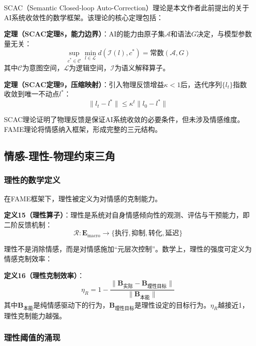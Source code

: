 \documentclass[12pt,a4paper]{article}
\theoremstyle{plain}
\newcommand{\ve}[1]{\bm{#1}}                    %
\newcommand{\Evec}{\ve{E}}                        %
\newcommand{\Bvec}{\ve{B}}                        %
\begin{document}
SCAC（Semantic Closed-loop Auto-Correction）理论是本文作者此前提出的关于AI系统收敛性的数学框架。该理论的核心定理包括：

\textbf{定理（SCAC定理8，能力边界）}：AI的能力由原子集$\mathcal{A}$和语法$G$决定，与模型参数量无关：
\begin{equation}
\sup_{c^* \in \mathcal{C}} \min_{l \in \mathcal{L}} d(\mathcal{I}(l), c^*) = \text{常数}(\mathcal{A}, G)
\label{eq:scac8}
\end{equation}
其中$\mathcal{C}$为意图空间，$\mathcal{L}$为逻辑空间，$\mathcal{I}$为语义解释算子。

\textbf{定理（SCAC定理9，压缩映射）}：引入物理反馈增益$\kappa < 1$后，迭代序列$\{l_t\}$指数收敛到唯一不动点$l^*$：
\begin{equation}
\|l_t - l^*\| \leq \kappa^t \|l_0 - l^*\|
\label{eq:scac9}
\end{equation}

SCAC理论证明了物理反馈是保证AI系统收敛的必要条件，但未涉及情感维度。FAME理论将情感纳入框架，形成完整的三元结构。

\subsection{情感-理性-物理约束三角}

\subsubsection{理性的数学定义}

在FAME框架下，理性被定义为对情感的克制能力。

\textbf{定义15（理性算子）}：理性是系统对自身情感倾向性的观测、评估与干预能力，即二阶反馈机制：
\begin{equation}
\mathcal{R}: \Evec_{\text{macro}} \to \{\text{执行}, \text{抑制}, \text{转化}, \text{延迟}\}
\label{eq:rational_operator}
\end{equation}

理性不是消除情感，而是对情感施加“元层次控制”。数学上，理性的强度可定义为情感克制效率：

\textbf{定义16（理性克制效率）}：
\begin{equation}
\eta_R = 1 - \frac{\|\Bvec_{\text{实际}} - \Bvec_{\text{理性目标}}\|}{\|\Bvec_{\text{本能}}\|}
\label{eq:eta_R}
\end{equation}
其中$\Bvec_{\text{本能}}$是纯情感驱动下的行为，$\Bvec_{\text{理性目标}}$是理性设定的目标行为。$\eta_R$越接近1，理性克制能力越强。

\subsubsection{理性阈值的涌现}
\end{document}
